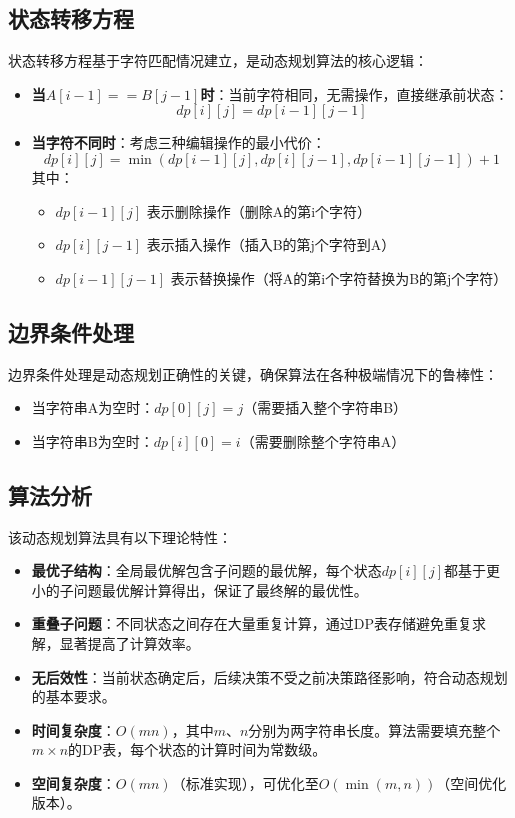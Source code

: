 \documentclass[a4paper]{article}
\begin{document}
\subsection{状态转移方程}
状态转移方程基于字符匹配情况建立，是动态规划算法的核心逻辑：
\begin{itemize}
	\item \textbf{当$A[i-1] == B[j-1]$时}：当前字符相同，无需操作，直接继承前状态：
	\[ dp[i][j] = dp[i-1][j-1] \]
	
	\item \textbf{当字符不同时}：考虑三种编辑操作的最小代价：
	\[ dp[i][j] = \min(dp[i-1][j], dp[i][j-1], dp[i-1][j-1]) + 1 \]
	其中：
	\begin{itemize}
		\item $dp[i-1][j]$ 表示删除操作（删除A的第i个字符）
		\item $dp[i][j-1]$ 表示插入操作（插入B的第j个字符到A）
		\item $dp[i-1][j-1]$ 表示替换操作（将A的第i个字符替换为B的第j个字符）
	\end{itemize}
\end{itemize}

\subsection{边界条件处理}
边界条件处理是动态规划正确性的关键，确保算法在各种极端情况下的鲁棒性：
\begin{itemize}
	\item 当字符串A为空时：$dp[0][j] = j$（需要插入整个字符串B）
	\item 当字符串B为空时：$dp[i][0] = i$（需要删除整个字符串A）
\end{itemize}

\subsection{算法分析}
该动态规划算法具有以下理论特性：
\begin{itemize}
	\item \textbf{最优子结构}：全局最优解包含子问题的最优解，每个状态$dp[i][j]$都基于更小的子问题最优解计算得出，保证了最终解的最优性。
	
	\item \textbf{重叠子问题}：不同状态之间存在大量重复计算，通过DP表存储避免重复求解，显著提高了计算效率。
	
	\item \textbf{无后效性}：当前状态确定后，后续决策不受之前决策路径影响，符合动态规划的基本要求。
	
	\item \textbf{时间复杂度}：$O(mn)$，其中$m$、$n$分别为两字符串长度。算法需要填充整个$m \times n$的DP表，每个状态的计算时间为常数级。
	
	\item \textbf{空间复杂度}：$O(mn)$（标准实现），可优化至$O(\min(m,n))$（空间优化版本）。
\end{itemize}
\end{document}
